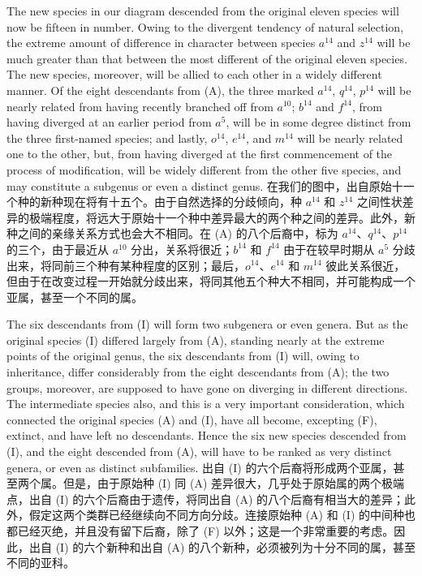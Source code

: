 \darwinpair
{The new species in our diagram descended from the original eleven species will now be fifteen in number. Owing to the divergent tendency of natural selection, the extreme amount of difference in character between species $a^{14}$ and $z^{14}$ will be much greater than that between the most different of the original eleven species. The new species, moreover, will be allied to each other in a widely different manner. Of the eight descendants from (A), the three marked $a^{14}$, $q^{14}$, $p^{14}$ will be nearly related from having recently branched off from $a^{10}$; $b^{14}$ and $f^{14}$, from having diverged at an earlier period from $a^{5}$, will be in some degree distinct from the three first-named species; and lastly, $o^{14}$, $e^{14}$, and $m^{14}$ will be nearly related one to the other, but, from having diverged at the first commencement of the process of modification, will be widely different from the other five species, and may constitute a subgenus or even a distinct genus.}
{在我们的图中，出自原始十一个种的新种现在将有十五个。由于自然选择的分歧倾向，种 $a^{14}$ 和 $z^{14}$ 之间性状差异的极端程度，将远大于原始十一个种中差异最大的两个种之间的差异。此外，新种之间的亲缘关系方式也会大不相同。在 (A) 的八个后裔中，标为 $a^{14}$、$q^{14}$、$p^{14}$ 的三个，由于最近从 $a^{10}$ 分出，关系将很近；$b^{14}$ 和 $f^{14}$ 由于在较早时期从 $a^{5}$ 分歧出来，将同前三个种有某种程度的区别；最后，$o^{14}$、$e^{14}$ 和 $m^{14}$ 彼此关系很近，但由于在改变过程一开始就分歧出来，将同其他五个种大不相同，并可能构成一个亚属，甚至一个不同的属。}

\darwinpair
{The six descendants from (I) will form two subgenera or even genera. But as the original species (I) differed largely from (A), standing nearly at the extreme points of the original genus, the six descendants from (I) will, owing to inheritance, differ considerably from the eight descendants from (A); the two groups, moreover, are supposed to have gone on diverging in different directions. The intermediate species also, and this is a very important consideration, which connected the original species (A) and (I), have all become, excepting (F), extinct, and have left no descendants. Hence the six new species descended from (I), and the eight descended from (A), will have to be ranked as very distinct genera, or even as distinct subfamilies.}
{出自 (I) 的六个后裔将形成两个亚属，甚至两个属。但是，由于原始种 (I) 同 (A) 差异很大，几乎处于原始属的两个极端点，出自 (I) 的六个后裔由于遗传，将同出自 (A) 的八个后裔有相当大的差异；此外，假定这两个类群已经继续向不同方向分歧。连接原始种 (A) 和 (I) 的中间种也都已经灭绝，并且没有留下后裔，除了 (F) 以外；这是一个非常重要的考虑。因此，出自 (I) 的六个新种和出自 (A) 的八个新种，必须被列为十分不同的属，甚至不同的亚科。}


